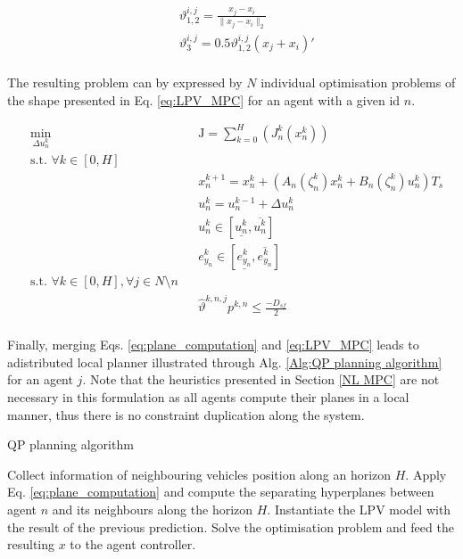 \documentclass[a4paper,fleqn]{cas-sc}
\begin{document}
\begin{equation}
\begin{aligned}
    \label{eq:plane_computation}
    &&& \vartheta_{1,2}^{i,j} = \frac{x_j - x_i}{\lVert x_j - x_i \rVert_2 } \\
    &&& \vartheta_{3}^{i,j} = 0.5\vartheta_{1,2}^{i,j}( x_j + x_i)'\\
\end{aligned}
\end{equation}

The resulting problem can by expressed by $N$ individual optimisation problems of the shape presented in Eq. \eqref{eq:LPV_MPC} for an agent with a given id $n$. 

\begin{equation}
\label{eq:LPV_MPC}
\begin{aligned}
    & \underset{\Delta u^k_n}{\text{min}} && \mathrm{J}=\sum_{k=0}^{H} ( J^k_n(x^k_n)) \\
    & \text{s.t. $\forall k \in [0,H]$}\\
    &&& x^{k+1}_n = x^{k}_n + ( A_n(\zeta^{k}_n) x^{k}_n + B_n(\zeta^{k}_n) u^{k}_n ) T_s \\
    &&& u^k_n = u^{k-1}_{n} + \Delta u^k_n \\ 
    &&& u^k_n \in [\underline{u^k_n}, \overline{u^k_n} ] \\
    &&& e_{y_{n}}^{k} \in [\underline{e_{y_{n}}^{k}}, \overline{e_{y_{n}}^{k}} ] \\
    & \text{s.t. $\forall k \in [0,H], \forall j \in N \setminus n$}\\
    &&& \hat{\vartheta}^{k,n,j} p^{k,n} \leq \frac{-D_{sf}}{2} \\     
\end{aligned}
\end{equation}

Finally, merging Eqs. \eqref{eq:plane_computation} and \eqref{eq:LPV_MPC} leads to adistributed local planner illustrated through Alg. \ref{Alg:QP planning algorithm} for an agent $j$.  Note that the heuristics presented in Section \ref{NL MPC} are not necessary in this formulation as all agents compute their planes in a local manner, thus there is no constraint duplication along the system. \\

\begin{algorithm}[h]
\caption{QP planning algorithm}
\label{Alg:QP planning algorithm}
    \State Collect information of neighbouring vehicles position along an horizon $H$.
    \State Apply Eq. \eqref{eq:plane_computation} and compute the separating hyperplanes between agent $n$ and its neighbours along the horizon $H$.
    \State Instantiate the LPV model with the result of the previous prediction. 
    \State Solve the optimisation problem and feed the resulting $x$ to the agent controller. 
\EndWhile
\end{algorithm}
\end{document}
